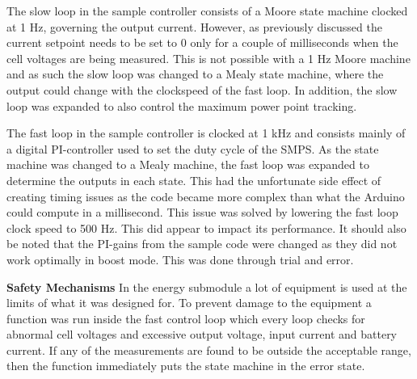 \documentclass[a4paper]{article}
\begin{document}
The slow loop in the sample controller consists
of a Moore state machine clocked at 1 Hz, governing the output current. However, as previously
discussed the current setpoint needs to be set to 0 only for a couple of milliseconds when
the cell voltages are being measured. This is not possible with a 1 Hz Moore machine and
as such the slow loop was changed to a Mealy state machine, where the output could change
with the clockspeed of the fast loop. In addition, the slow loop was expanded to also control
the maximum power point tracking.

The fast loop in the sample controller is clocked at 1 kHz and consists mainly of a 
digital PI-controller used to set the duty cycle of the SMPS. As the state machine 
was changed to a Mealy machine, the fast loop was expanded to determine the outputs in
each state. This had the unfortunate side effect of creating timing issues as the code
became more complex than what the Arduino could compute in a millisecond. This issue was
solved by lowering the fast loop clock speed to 500 Hz. This did appear to impact its
performance.
It should also be noted that the PI-gains from the sample code were changed as they did
not work optimally in boost mode. This was done through trial and error.

\textbf{Safety Mechanisms}
\vspace{10pt} 
\newline
In the energy submodule a lot of equipment is used at the limits of what it was designed for.
To prevent damage to the equipment a function was run inside the fast control loop
which every loop checks for abnormal cell voltages and excessive output voltage, input
current and battery current. If any of the measurements are found to be outside the
acceptable range, then the function immediately puts the state machine in the error
state.
\end{document}
